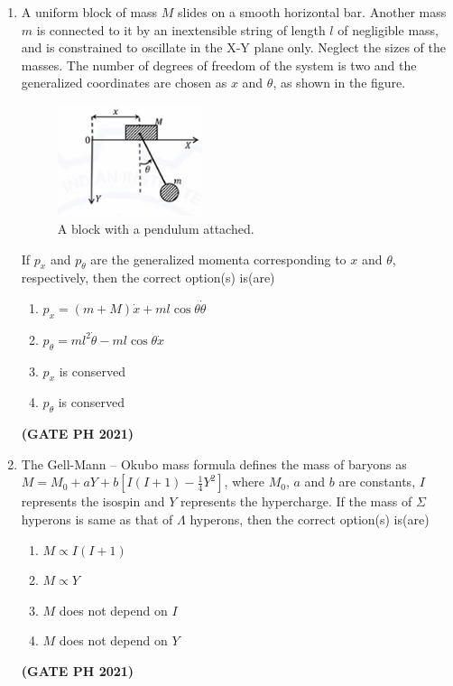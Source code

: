 \documentclass[14pt, a4paper]{extarticle}
\begin{document}
\begin{enumerate}[label=\textbf{Q.\arabic*}]
\begin{enumerate}[label=\textbf{Q.\arabic*}]
\item A uniform block of mass $M$ slides on a smooth horizontal bar. Another mass $m$ is connected to it by an inextensible string of length $l$ of negligible mass, and is constrained to oscillate in the X-Y plane only. Neglect the sizes of the masses. The number of degrees of freedom of the system is two and the generalized coordinates are chosen as $x$ and $\theta$, as shown in the figure.
\begin{figure}[H]
\centering
\includegraphics[width=0.4\textwidth]{figs/q54fig21.png}
\caption{A block with a pendulum attached.}
\label{fig:q44ph}
\end{figure}
If $p_x$ and $p_{\theta}$ are the generalized momenta corresponding to $x$ and $\theta$, respectively, then the correct option(s) is(are)
\begin{enumerate}
\item $p_x = (m+M)\dot{x} + ml\cos\theta\dot{\theta}$
\item $p_{\theta} = ml^2\dot{\theta} - ml\cos\theta\dot{x}$
\item $p_x$ is conserved
\item $p_{\theta}$ is conserved
\end{enumerate}
\hfill \textbf{(GATE PH 2021)}

\item The Gell-Mann – Okubo mass formula defines the mass of baryons as $M=M_0+aY+b\left[I(I+1)-\frac{1}{4}Y^2\right]$, where $M_0$, $a$ and $b$ are constants, $I$ represents the isospin and $Y$ represents the hypercharge. If the mass of $\Sigma$ hyperons is same as that of $\Lambda$ hyperons, then the correct option(s) is(are)
\begin{enumerate}
\item $M \propto I(I+1)$
\item $M \propto Y$
\item $M$ does not depend on $I$
\item $M$ does not depend on $Y$
\end{enumerate}
\hfill \textbf{(GATE PH 2021)}


\end{enumerate}
\end{enumerate}
\end{document}
